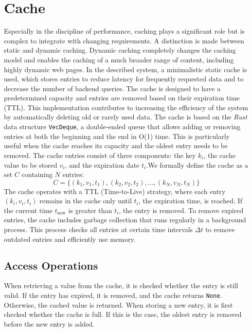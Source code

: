 \documentclass[twocolumn]{webofc}
\begin{document}
\section{Cache}
Especially in the discipline of performance, caching plays a significant role but is complex to integrate with changing requirements\cite{hennessy2011computer}. A distinction is made between static and dynamic caching. Dynamic caching completely changes the caching model and enables the caching of a much broader range of content, including highly dynamic web pages\cite{cloudflare2024caching}. In the described system, a minimalistic static cache is used, which stores entries to reduce latency for frequently requested data and to decrease the number of backend queries. The cache is designed to have a predetermined capacity and entries are removed based on their expiration time (TTL). This implementation contributes to increasing the efficiency of the system by automatically deleting old or rarely used data. The cache is based on the \textit{Rust} data structure \texttt{VecDeque}, a double-ended queue that allows adding or removing entries at both the beginning and the end in O(1) time\cite{rust_vecdeque}. This is particularly useful when the cache reaches its capacity and the oldest entry needs to be removed. The cache entries consist of three components: the key \( k_i \), the cache value to be stored \( v_i \), and the expiration date \( t_i \).We formally define the cache as a set \( C \) containing \( N \) entries:
\[
    C = \{ (k_1, v_1, t_1), (k_2, v_2, t_2), \dots, (k_N, v_N, t_N) \}
\]
The cache operates with a TTL (Time-to-Live) strategy, where each entry \( (k_i, v_i, t_i) \) remains in the cache only until \( t_i \), the expiration time, is reached. If the current time \( t_{\text{now}} \) is greater than \( t_i \), the entry is removed. To remove expired entries, the cache includes garbage collection that runs regularly in a background process. This process checks all entries at certain time intervals \( \Delta t \) to remove outdated entries and efficiently use memory.

\subsection{Access Operations}
When retrieving a value from the cache, it is checked whether the entry is still valid. If the entry has expired, it is removed, and the cache returns \texttt{None}. Otherwise, the cached value is returned. When storing a new entry, it is first checked whether the cache is full. If this is the case, the oldest entry is removed before the new entry is added.
\end{document}
